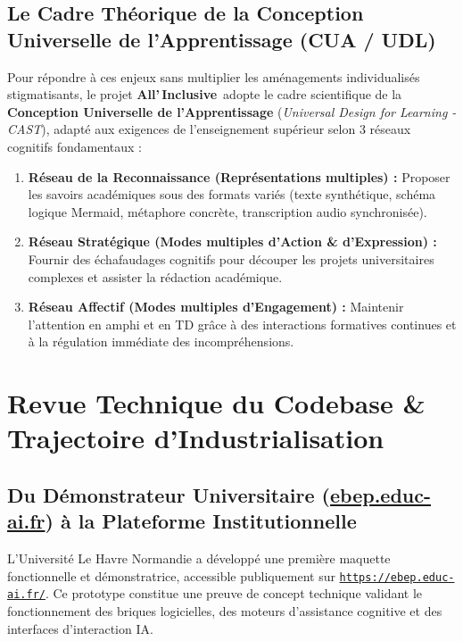 \documentclass[11pt,a4paper]{article}
\newcommand{\AIBrand}{\textbf{\textcolor{primaryRed}{A}ll'\,\textcolor{primaryRed}{I}nclusive}}
\begin{document}
\subsection{Le Cadre Théorique de la Conception Universelle de l'Apprentissage (CUA / UDL)}
Pour répondre à ces enjeux sans multiplier les aménagements individualisés stigmatisants, le projet \AIBrand\ adopte le cadre scientifique de la \textbf{Conception Universelle de l'Apprentissage} (\textit{Universal Design for Learning - CAST}), adapté aux exigences de l'enseignement supérieur selon 3 réseaux cognitifs fondamentaux :
\begin{enumerate}[leftmargin=1.5em, itemsep=2pt]
    \item \textbf{Réseau de la Reconnaissance (Représentations multiples) :} Proposer les savoirs académiques sous des formats variés (texte synthétique, schéma logique Mermaid, métaphore concrète, transcription audio synchronisée).
    \item \textbf{Réseau Stratégique (Modes multiples d'Action \& d'Expression) :} Fournir des échafaudages cognitifs pour découper les projets universitaires complexes et assister la rédaction académique.
    \item \textbf{Réseau Affectif (Modes multiples d'Engagement) :} Maintenir l'attention en amphi et en TD grâce à des interactions formatives continues et à la régulation immédiate des incompréhensions.
\end{enumerate}

\newpage
\section{Revue Technique du Codebase \& Trajectoire d'Industrialisation}

\subsection{Du Démonstrateur Universitaire (\href{https://ebep.educ-ai.fr/}{ebep.educ-ai.fr}) à la Plateforme Institutionnelle}
L'Université Le Havre Normandie a développé une première maquette fonctionnelle et démonstratrice, accessible publiquement sur \href{https://ebep.educ-ai.fr/}{\texttt{https://ebep.educ-ai.fr/}}. Ce prototype constitue une preuve de concept technique validant le fonctionnement des briques logicielles, des moteurs d'assistance cognitive et des interfaces d'interaction IA.
\end{document}
